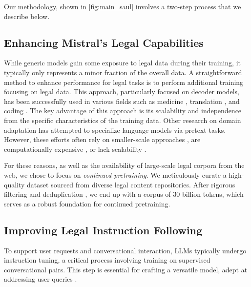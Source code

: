Our methodology, shown in \autoref{fig:main_saul} involves a two-step process that we describe below.

\subsection{Enhancing Mistral's Legal Capabilities}
While generic models \cite{touvron2023llama,taylor2022galactica,zhang2022opt,gu2023mamba,falcon,zhang2024tinyllama,faysse2024croissantllm} gain some exposure to legal data during their training, it typically only represents a minor fraction of the overall data. A straightforward method to enhance performance for legal tasks is to perform additional training focusing on legal data. This approach, particularly focused on decoder models, has been successfully used in various fields such as medicine \cite{chen2023meditron,ji2023domain}, translation \cite{xu2023paradigm,wu2024adapting}, and coding \cite{roziere2023code}. 
The key advantage of this approach is its scalability and independence from the specific characteristics of the training data.
Other research on domain adaptation has attempted to specialize language models via pretext tasks. However, these efforts often rely on smaller-scale approaches \cite{niklaus2023can}, are computationally expensive \cite{vu2020effective,lu2023prompt}, or lack scalability \cite{cheng2023adapting,cui2023chatlaw,nishida2019unsupervised}.

For these reasons, as well as the availability of large-scale legal corpora from the web, we chose to focus on \emph{continued pretraining}.
We meticulously curate a high-quality dataset sourced from diverse legal content repositories. After rigorous filtering 
 \citep{penedo2023refinedweb} and deduplication \citep{chenghao_mou_2023_8364980,kocetkov2023the}, we end up with a corpus of $30$ billion tokens, which serves as a robust foundation for continued pretraining.
 
\subsection{Improving Legal Instruction Following}
To support user requests and conversational interaction, LLMs typically undergo instruction tuning, a critical process involving training on supervised conversational pairs. This step is essential for crafting a versatile model, adept at addressing user queries \cite{wang2023far,wei2021finetuned,chung2022scaling,Faysse_2023,ding2023enhancing,wang2023selfinstruct}.

